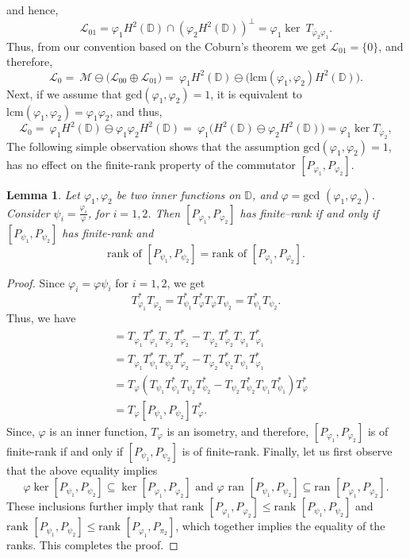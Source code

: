 \documentclass[12pt, a4 paper]{amsart}
\newcommand{\cll}{\mathcal{L}}
\newcommand{\clm}{\mathcal{M}}
\newcommand{\D}{\mathbb{D}}
\theoremstyle{definition}
\theoremstyle{plain}
\newtheorem{lem}[thm]{Lemma}
\theoremstyle{definition}
\numberwithin{equation}{section}
\let\phi=\varphi
\begin{document}
and hence,
\begin{equation}\label{L_01}
\cll_{01}= \phi_1 H^2(\mathbb{D}) \cap (\phi_2 H^2(\mathbb{D} ))^{\perp} = \phi_1 \ker~T_{\bar \phi_2 \phi_1}.
\end{equation}
Thus, from our convention based on the Coburn's theorem we get $\cll_{01} = \{0\}$, and therefore,
\begin{equation}\label{L_0}
\cll_0 =~\clm \ominus \big( \cll_{00} \oplus \cll_{01} \big)
    =~\phi_1H^2(\D)\ominus \big(\mbox{lcm}(\phi_1,\phi_2)H^2({\mathbb{D}} ) \big).
\end{equation}
Next, if we assume that $\mbox{gcd}(\phi_1, \phi_2) = 1$,  it is equivalent to $\mbox{lcm}(\phi_1, \phi_2)= \phi_1 \phi_2 $, and thus,
\begin{equation}\label{new L_0}
\cll_0 
    =~\phi_1H^2(\D) \ominus \phi_1 \phi_2H^2(\D) =~\phi_1 \big(H^2(\D) \ominus \phi_2H^2(\D)\big) = \phi_1 \ker T_{\bar \phi_2},
\end{equation}
The following simple observation shows that the assumption $\mbox{gcd}(\phi_1, \phi_2)=1$, has no effect on the finite-rank property of the commutator $[P_{\phi_1}, P_{\phi_2}]$.
\begin{lem}\label{gcd}
Let $\phi_1,\phi_2$ be two inner functions on $\D$, and $\phi=\mbox{gcd }(\phi_1,\phi_2)$. Consider $\psi_i = \frac{\phi_i}{\phi}$, for $i=1,2$. Then $[P_{\phi_1}, P_{\phi_2}]$ has finite--rank if and only if $[P_{\psi_1}, P_{\psi_2}]$ has finite-rank and $$\text{rank of }[P_{\psi_1}, P_{\psi_2}]=\text{rank of }[P_{\phi_1}, P_{\phi_2}].$$
\end{lem}
\begin{proof}
Since $\phi_i = \phi \psi_i$ for $i=1,2$, we get
\[
T_{\phi_1}^* T_{\phi_2}  = T_{\psi_1}^*  T_{\phi}^*  T_{\phi} T_{\psi_2} = T_{\psi_1}^* T_{\psi_2}.
\]
Thus, we have
\begin{align*}
[P_{\phi_1}, P_{\phi_2}]  &= T_{\phi_1} T_{\phi_1}^* T_{\phi_2} T_{\phi_2}^* - T_{\phi_2} T_{\phi_2}^*T_{\phi_1} T_{\phi_1}^*\\
&= T_{\phi_1} T_{\psi_1}^* T_{\psi_2} T_{\phi_2}^* - T_{\phi_2} T_{\psi_2}^* T_{\psi_1} T_{\phi_1}^*\\
&= T_{\phi} \left( T_{\psi_1} T_{\psi_1}^* T_{\psi_2} T_{\psi_2}^* - T_{\psi_2} T_{\psi_2}^* T_{\psi_1} T_{\psi_1}^* \right) T_{\phi}^*\\
&= T_{\phi}[P_{\psi_1}, P_{\psi_2}]  T_{\phi}^*.
\end{align*}
Since, $\phi$ is an inner function, $T_{\phi}$ is an isometry, and therefore, $[P_{\phi_1}, P_{\phi_2}] $ is of finite-rank if and only if $[P_{\psi_1}, P_{\psi_2}]$ is of finite-rank. Finally, let us first observe that the above equality implies
\[
\phi \ker [P_{\psi_1}, P_{\psi_2}] \subseteq \ker [P_{\phi_1}, P_{\phi_2}] \text{ and } \phi \mbox{ ran } [P_{\psi_1}, P_{\psi_2}] \subseteq \mbox{ran } [P_{\phi_1}, P_{\phi_2}].
\]
These inclusions further imply that $\mbox{rank }[P_{\phi_1}, P_{\phi_2}] \leq \mbox{rank }[P_{\psi_1}, P_{\psi_2}]$ and $\mbox{rank }[P_{\psi_1}, P_{\psi_2}] \leq \mbox{rank }[P_{\phi_1}, P_{\pi_2}]$, which together implies the equality of the ranks. This completes the proof.
\end{proof}
\end{document}
